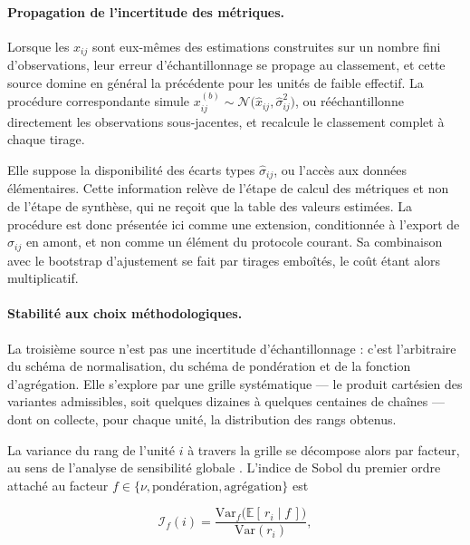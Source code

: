 \documentclass[11pt,a4paper]{article}
\theoremstyle{definition}
\theoremstyle{remark}
\newcommand{\EE}{\mathbb{E}}
\begin{document}
\bigskip

\paragraph{Propagation de l'incertitude des métriques.} Lorsque les $x_{ij}$ sont
eux-mêmes des estimations construites sur un nombre fini d'observations, leur erreur
d'échantillonnage se propage au classement, et cette source domine en général la
précédente pour les unités de faible effectif. La procédure correspondante simule
$x_{ij}^{(b)} \sim \mathcal{N}\big(\hat{x}_{ij}, \hat{\sigma}^2_{ij}\big)$, ou
rééchantillonne directement les observations sous-jacentes, et recalcule le classement
complet à chaque tirage.

\medskip

Elle suppose la disponibilité des écarts types $\hat{\sigma}_{ij}$, ou l'accès aux données
élémentaires. Cette information relève de l'étape de calcul des métriques et non de l'étape
de synthèse, qui ne reçoit que la table des valeurs estimées. La procédure est donc
présentée ici comme une extension, conditionnée à l'export de $\hat{\sigma}_{ij}$ en amont,
et non comme un élément du protocole courant. Sa combinaison avec le bootstrap
d'ajustement se fait par tirages emboîtés, le coût étant alors multiplicatif.

\bigskip

\paragraph{Stabilité aux choix méthodologiques.} La troisième source n'est pas une
incertitude d'échantillonnage : c'est l'arbitraire du schéma de normalisation, du schéma de
pondération et de la fonction d'agrégation. Elle s'explore par une grille systématique ---
le produit cartésien des variantes admissibles, soit quelques dizaines à quelques centaines
de chaînes --- dont on collecte, pour chaque unité, la distribution des rangs obtenus.

\medskip

La variance du rang de l'unité $i$ à travers la grille se décompose alors par facteur, au
sens de l'analyse de sensibilité globale \citep{saisana2005}. L'indice de Sobol du premier
ordre attaché au facteur $f \in \{\nu, \text{pondération}, \text{agrégation}\}$ est

\medskip

\[
  \mathcal{I}_f(i) = \frac{\mathrm{Var}_f\big(\EE[\,r_i \mid f\,]\big)}{\mathrm{Var}(r_i)} ,
\]
\end{document}
